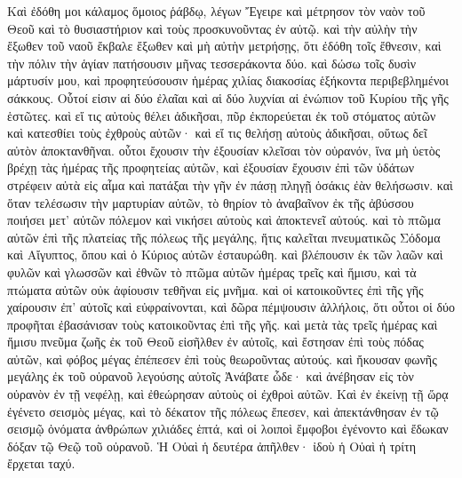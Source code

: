 \begin{pages}
    \begin{Rightside}
        \beginnumbering
		Καὶ ἐδόθη μοι κάλαμος ὅμοιος ῥάβδῳ, λέγων Ἔγειρε καὶ μέτρησον τὸν ναὸν τοῦ Θεοῦ καὶ τὸ θυσιαστήριον καὶ τοὺς προσκυνοῦντας ἐν αὐτῷ. καὶ τὴν αὐλὴν τὴν ἔξωθεν τοῦ ναοῦ ἔκβαλε ἔξωθεν καὶ μὴ αὐτὴν μετρήσῃς, ὅτι ἐδόθη τοῖς ἔθνεσιν, καὶ τὴν πόλιν τὴν ἁγίαν πατήσουσιν μῆνας τεσσεράκοντα δύο.
		\pend
		\pstart
		καὶ δώσω τοῖς δυσὶν μάρτυσίν μου, καὶ προφητεύσουσιν ἡμέρας χιλίας διακοσίας ἑξήκοντα περιβεβλημένοι σάκκους. Οὗτοί εἰσιν αἱ δύο ἐλαῖαι καὶ αἱ δύο λυχνίαι αἱ ἐνώπιον τοῦ Κυρίου τῆς γῆς ἑστῶτες. καὶ εἴ τις αὐτοὺς θέλει ἀδικῆσαι, πῦρ ἐκπορεύεται ἐκ τοῦ στόματος αὐτῶν καὶ κατεσθίει τοὺς ἐχθροὺς αὐτῶν· καὶ εἴ τις θελήσῃ αὐτοὺς ἀδικῆσαι, οὕτως δεῖ αὐτὸν ἀποκτανθῆναι. 
		\pend
		\pstart
		οὗτοι ἔχουσιν τὴν ἐξουσίαν κλεῖσαι τὸν οὐρανόν, ἵνα μὴ ὑετὸς βρέχῃ τὰς ἡμέρας τῆς προφητείας αὐτῶν, καὶ ἐξουσίαν ἔχουσιν ἐπὶ τῶν ὑδάτων στρέφειν αὐτὰ εἰς αἷμα καὶ πατάξαι τὴν γῆν ἐν πάσῃ πληγῇ ὁσάκις ἐὰν θελήσωσιν. καὶ ὅταν τελέσωσιν τὴν μαρτυρίαν αὐτῶν, τὸ θηρίον τὸ ἀναβαῖνον ἐκ τῆς ἀβύσσου ποιήσει μετ’ αὐτῶν πόλεμον καὶ νικήσει αὐτοὺς καὶ ἀποκτενεῖ αὐτούς. 
		\pend
		\pstart
		καὶ τὸ πτῶμα αὐτῶν ἐπὶ τῆς πλατείας τῆς πόλεως τῆς μεγάλης, ἥτις καλεῖται πνευματικῶς Σόδομα καὶ Αἴγυπτος, ὅπου καὶ ὁ Κύριος αὐτῶν ἐσταυρώθη. καὶ βλέπουσιν ἐκ τῶν λαῶν καὶ φυλῶν καὶ γλωσσῶν καὶ ἐθνῶν τὸ πτῶμα αὐτῶν ἡμέρας τρεῖς καὶ ἥμισυ, καὶ τὰ πτώματα αὐτῶν οὐκ ἀφίουσιν τεθῆναι εἰς μνῆμα. 
		\pend
		\pstart
		καὶ οἱ κατοικοῦντες ἐπὶ τῆς γῆς χαίρουσιν ἐπ’ αὐτοῖς καὶ εὐφραίνονται, καὶ δῶρα πέμψουσιν ἀλλήλοις, ὅτι οὗτοι οἱ δύο προφῆται ἐβασάνισαν τοὺς κατοικοῦντας ἐπὶ τῆς γῆς. καὶ μετὰ τὰς τρεῖς ἡμέρας καὶ ἥμισυ πνεῦμα ζωῆς ἐκ τοῦ Θεοῦ εἰσῆλθεν ἐν αὐτοῖς, καὶ ἔστησαν ἐπὶ τοὺς πόδας αὐτῶν, καὶ φόβος μέγας ἐπέπεσεν ἐπὶ τοὺς θεωροῦντας αὐτούς. 
		\pend
		\pstart
		καὶ ἤκουσαν φωνῆς μεγάλης ἐκ τοῦ οὐρανοῦ λεγούσης αὐτοῖς Ἀνάβατε ὧδε· καὶ ἀνέβησαν εἰς τὸν οὐρανὸν ἐν τῇ νεφέλῃ, καὶ ἐθεώρησαν αὐτοὺς οἱ ἐχθροὶ αὐτῶν. Καὶ ἐν ἐκείνῃ τῇ ὥρᾳ ἐγένετο σεισμὸς μέγας, καὶ τὸ δέκατον τῆς πόλεως ἔπεσεν, καὶ ἀπεκτάνθησαν ἐν τῷ σεισμῷ ὀνόματα ἀνθρώπων χιλιάδες ἑπτά, καὶ οἱ λοιποὶ ἔμφοβοι ἐγένοντο καὶ ἔδωκαν δόξαν τῷ Θεῷ τοῦ οὐρανοῦ. Ἡ Οὐαὶ ἡ δευτέρα ἀπῆλθεν· ἰδοὺ ἡ Οὐαὶ ἡ τρίτη ἔρχεται ταχύ. 

\end{Rightside}
\end{pages}
